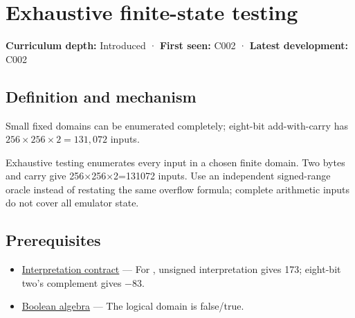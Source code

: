 \hypertarget{appendix-05db24ccc28a}{}\label{referencestart:appendix-05db24ccc28a}
\section{Exhaustive finite-state testing}\label{appendix-05db24ccc28a-exhaustive-finite-state-testing}

\hypertarget{appendix-05db24ccc28a-exhaustive-finite-state-testing}{}

\textbf{Curriculum depth:} Introduced · \textbf{First seen:} C002 · \textbf{Latest development:} C002

\begin{allmightroledefinition}

\subsection{Definition and mechanism}\label{appendix-05db24ccc28a-definition-and-mechanism}

\hypertarget{appendix-05db24ccc28a-definition-and-mechanism}{}

Small fixed domains can be enumerated completely; eight-bit add-with-carry has \(256\times256\times2=131{,}072\) inputs.

\end{allmightroledefinition}

Exhaustive testing enumerates every input in a chosen finite domain. Two bytes and carry give 256×256×2=131072 inputs. Use an independent signed-range oracle instead of restating the same overflow formula; complete arithmetic inputs do not cover all emulator state.

\subsection{Prerequisites}\label{appendix-05db24ccc28a-prerequisites}

\hypertarget{appendix-05db24ccc28a-prerequisites}{}

\begin{itemize}
\tightlist
\item
  \hyperref[appendix-f414bd4ed05c]{Interpretation contract} --- For , unsigned interpretation gives 173; eight-bit two's complement gives −83.
\item
  \hyperref[appendix-24475e1596a8]{Boolean algebra} --- The logical domain is false/true.
\end{itemize}

